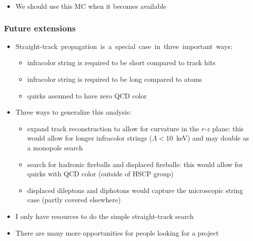 \documentclass[compress]{beamer}
\begin{document}
\begin{frame}
\begin{itemize}
\item We should use this MC when it becomes available

\end{itemize}
\end{frame}

\begin{frame}
\frametitle{Future extensions}
\begin{itemize}
\item \mbox{Straight-track propagation is a special case in three important ways:\hspace{-1 cm}}
\begin{itemize}
\item infracolor string is required to be short compared to track hits
\item infracolor string is required to be long compared to atoms
\item quirks assumed to have zero QCD color
\end{itemize}

\item Three ways to generalize this analysis:
\begin{itemize}
\item expand track reconstruction to allow for curvature in the $r$-$z$ plane: this would allow for longer infracolor strings ($\Lambda < 10$~keV) and may double as a monopole search
\item search for hadronic fireballs and displaced fireballs: this would allow for quirks with QCD color (outside of HSCP group)
\item displaced dileptons and diphotons would capture the microscopic string case (partly covered elsewhere)
\end{itemize}

\item I only have resources to do the simple straight-track search

\item There are many more opportunities for people looking for a project
\end{itemize}
\end{frame}
\end{document}
